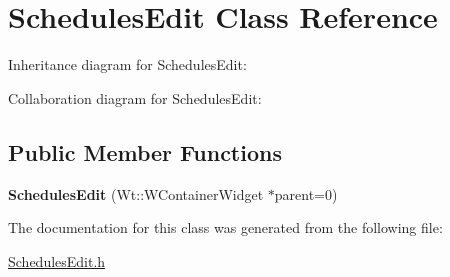 \hypertarget{classSchedulesEdit}{}\section{Schedules\+Edit Class Reference}
\label{classSchedulesEdit}


Inheritance diagram for Schedules\+Edit\+:


Collaboration diagram for Schedules\+Edit\+:
\subsection*{Public Member Functions}
\begin{DoxyCompactItemize}
\item 
\mbox{\label{classSchedulesEdit_a80f36cdc49a6eb723303db40b5bca37d}} 
{\bfseries Schedules\+Edit} (Wt\+::\+W\+Container\+Widget $\ast$parent=0)
\end{DoxyCompactItemize}


The documentation for this class was generated from the following file\+:\begin{DoxyCompactItemize}
\item 
\hyperlink{SchedulesEdit_8h}{Schedules\+Edit.\+h}\end{DoxyCompactItemize}
